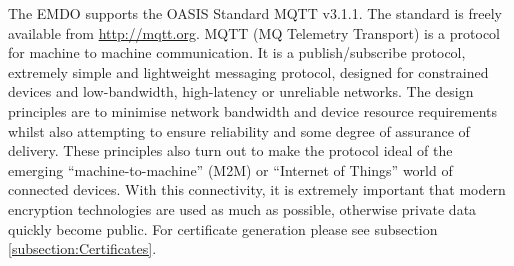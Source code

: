 The EMDO supports the OASIS Standard MQTT v3.1.1. The standard is freely available from \url{http://mqtt.org}.\newline
MQTT (MQ Telemetry Transport) is a protocol for machine to machine communication. It is a publish/subscribe protocol, extremely simple and lightweight messaging protocol, designed for constrained devices and low-bandwidth, high-latency or unreliable networks. The design principles are to minimise network bandwidth and device resource requirements whilst also attempting to ensure reliability and some degree of assurance of delivery. \newline
These principles also turn out to make the protocol ideal of the emerging “machine-to-machine” (M2M) or “Internet of Things” world of connected devices. With this connectivity, it is extremely important that modern encryption technologies are used as much as possible, otherwise private data quickly become public.\newline
For certificate generation please see subsection \ref{subsection:Certificates}.\newline\newline

